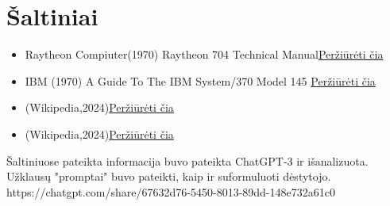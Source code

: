\documentclass{article}
\begin{document}
\section*{Šaltiniai}
\begin{itemize}
    \item Raytheon Compiuter(1970) Raytheon 704 Technical Manual\href{https://bitsavers.org/pdf/raytheon/70x/Ray704_TechnicalManual_Jul1970.pdf}{Peržiūrėti čia}
    \item IBM (1970) A Guide To The IBM System/370 Model 145 \href{http://www.bitsavers.org/pdf/ibm/370/systemGuide/GC20-1734-2_370-145_Guide_Aug72.pdf}{Peržiūrėti čia}
    \item (Wikipedia,2024)\href{https://en.wikipedia.org/wiki/IBM_System/370}{Peržiūrėti čia}
    \item (Wikipedia,2024)\href{https://en.wikipedia.org/wiki/Raytheon_704}{Peržiūrėti čia}
\end{itemize}
Šaltiniuose pateikta informacija buvo pateikta ChatGPT-3 ir išanalizuota. Užklausų "promptai" buvo pateikti, kaip ir suformuluoti dėstytojo.
https://chatgpt.com/share/67632d76-5450-8013-89dd-148e732a61c0
\end{document}
